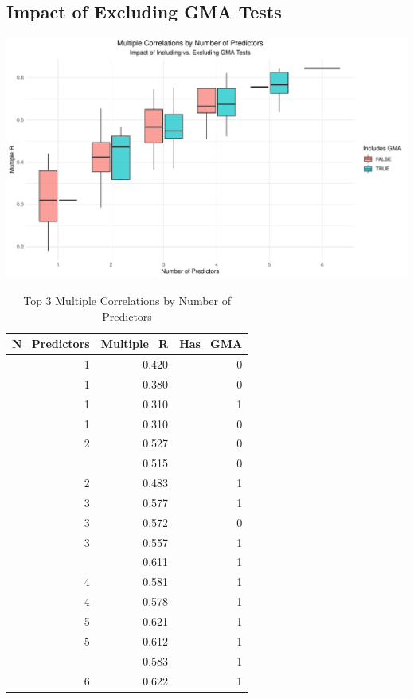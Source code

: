 \documentclass[
]{article}
\begin{document}
\subsection{Impact of Excluding GMA
Tests}\label{impact-of-excluding-gma-tests}

\begin{center}\includegraphics{berry_2024_reproducibility_report_files/figure-latex/gma-impact-1} \end{center}

\begingroup\fontsize{10}{12}\selectfont

\begin{longtable}[t]{rrr}
\caption{\label{tab:gma-impact}Top 3 Multiple Correlations by Number of Predictors}\\
\toprule
N\_Predictors & Multiple\_R & Has\_GMA\\
\midrule
1 & 0.420 & 0\\
1 & 0.380 & 0\\
1 & 0.310 & 1\\
1 & 0.310 & 0\\
2 & 0.527 & 0\\
\addlinespace
2 & 0.515 & 0\\
2 & 0.483 & 1\\
3 & 0.577 & 1\\
3 & 0.572 & 0\\
3 & 0.557 & 1\\
\addlinespace
4 & 0.611 & 1\\
4 & 0.581 & 1\\
4 & 0.578 & 1\\
5 & 0.621 & 1\\
5 & 0.612 & 1\\
\addlinespace
5 & 0.583 & 1\\
6 & 0.622 & 1\\
\bottomrule
\end{longtable}
\endgroup{}
\end{document}
